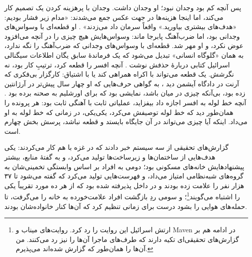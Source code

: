 پس آنچه کم بود وجدان نبود؛ او وجدان داشت. وجدان با پرهزینه کردن یک تصمیم کار می‌کند، اما اینجا هزینه‌ها در جهت عکس جمع می‌شدند: «مدام زیر فشار بودیم: «هدف‌های بیشتری بیاورید.» واقعاً سرمان داد می‌زدند» \autocite{abraham2024lavender}. او قطعه‌ای با وسواس‌های وجدانی بود، اما ضرب‌آهنگ پابرجا ماند: وسواس‌هایش هیچ چیزی را در آنچه می‌افزود عوض نکرد، و او مهر شد. قطعه‌ای با وسواس‌های وجدانی که ضرب‌آهنگ را نگه ندارد، به همان «گلوگاه انسانی» تبدیل می‌شود که یک فرماندهٔ سابق یگان اطلاعات سیگنالی اسرائیل کتابی دربارهٔ حذفش نوشت \autocite{ys2021humanmachine}. آنچه افسر را قطعه کرد، ترتیبِ کار بود، نه نگرشش. یک قطعه می‌تواند با اکراه همراهی کند یا با اشتیاق: کارگزار بی‌فکری که آرنت در دادگاه آیشمن دید \autocite{arendt1963eichmann}، به گواهی حرف‌هایی که او چهار سال پیش‌تر در آرژانتین زده بود، بی‌آنکه چیزی در میان باشد، نمایشی بود که برای اورشلیم به صحنه برده بود \autocite{stangneth2014eichmann}. آنچه خط لوله به افسر اجازه داد بیفزاید، عملیاتی ثابت با آهنگی ثابت بود: هر پرونده را همان‌طور دید که خط لوله توصیفش می‌کرد، یکی‌یکی، در زمانی که خط لوله به او می‌داد. اینکه آیا چیزی می‌تواند در آن جایگاه بایستد و قطعه نباشد، پرسش بخش چهارم است.

گزارش‌های تحقیقی از سه سیستم خبر دادند که در غزه با هم کار می‌کردند: یکی هدف‌هایی از ساختمان‌ها و زیرساخت‌ها تولید می‌کرد، و به گفتهٔ منابع، بیشتر پیشنهادهایش خانه‌های مسکونی بود؛ دومی به افراد بر اساس وابستگی تخمینی‌شان به گروه‌های شبه‌نظامی امتیاز می‌داد، و فهرست‌هایی تولید می‌کرد که گفته می‌شود تا ۳۷ هزار نفر را علامت زده بودند و در داخل پذیرفته شده بود که از هر ده مورد تقریباً یکی را اشتباه می‌گویند\footnote{ارتش اسرائیل این روایت را رد کرد. روایت‌های میناب و Maven در ادامه هم بر گزارش‌های تحقیقی‌ای تکیه دارند که طرف‌های ماجرا آن‌ها را نیز رد می‌کنند. من آن‌ها را همان‌طور که گزارش شده‌اند می‌پذیرم.}؛ و سومی ردِ بازگشت افراد علامت‌خورده به خانه را می‌گرفت، تا حمله‌های هوایی را بشود درست برای زمانی تنظیم کرد که آن‌ها کنار خانواده‌شان بودند.


